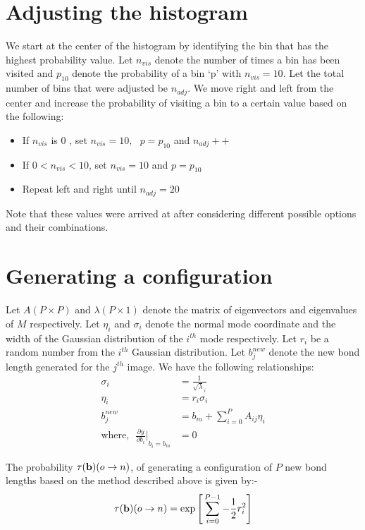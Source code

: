     \section{Adjusting the histogram}
        We start at the center of the histogram by identifying the bin that has the highest probability value. Let $n_{vis}$ denote the number of times a bin has been visited and $p_{10}$ denote the probability of a bin `p' with $n_{vis} = 10$. Let the total number of bins that were adjusted be $n_{adj}$. We move right and left from the center and increase the probability of visiting a bin to a certain value based on the following:
        \begin{itemize}
            \item If $n_{vis}$ is $0$ , set $n_{vis} = 10, \: \: \: p = p_{10}$ and $n_{adj}++$
            \item If $0 < n_{vis} < 10$, set $n_{vis} = 10$ and $p = p_{10}$
            \item Repeat left and right until $n_{adj} = 20$
        \end{itemize}

        Note that these values were arrived at after considering different possible options and their combinations.

    \section{Generating a configuration}
        Let $A (P \times P)$ and $\lambda (P \times 1)$ denote the matrix of eigenvectors  and eigenvalues of $M$ respectively. Let $\eta_i$ and $\sigma_i$ denote the normal mode coordinate and the width of the Gaussian distribution of the $i^{th}$ mode respectively. Let $r_i$ be a random number from the $i^{th}$ Gaussian distribution. Let $b^{new}_j$ denote the new bond length generated for the $j^{th}$ image. We have the following relationships:
        \begin{equation}
            \begin{aligned}
                \sigma_i &= \frac{1}{\sqrt \lambda_i}\\
                \eta_i &= r_i  \sigma_i\\
                b_j^{new} &= b_m + \displaystyle\sum\limits_{i=0}^P A_{ij}  \eta_i\\
                \text{where,} \: \: \: {\frac{\partial y}{\partial b_i} \Bigg|}_{b_i = b_m} &= 0
            \end{aligned}
        \end{equation}

        The probability $\tau({\mathbf {b}}) (o \to n)$, of generating a configuration of $P$ new bond lengths based on the method described above is given by:-
        \begin{equation}
            \tau ({\mathbf {b}}) (o \to n) = \exp \Bigg[ \displaystyle\sum\limits_{i=0}^{P-1} - \frac{1}{2}  r_i^2 \Bigg]
        \end{equation}
